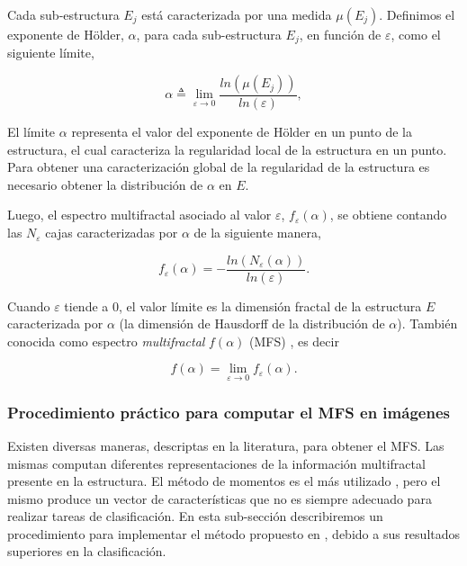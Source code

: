 Cada sub-estructura $E_{j}$ está caracterizada por una medida $\mu(E_{j})$.
Definimos el exponente de H\"older, $\alpha$, para cada sub-estructura $E_{j}$, en función de $\varepsilon$, como el siguiente límite,


\begin{equation}
\alpha \triangleq \lim_{\varepsilon \rightarrow 0}{\frac{ln(\mu(E_{j}))}{ln(\varepsilon)} },
\label{eq:holder}
\end{equation}
\noindent

El límite $\alpha$ representa el valor del exponente de H\"older en un punto de la estructura, el cual caracteriza la regularidad local de la estructura en un punto.
Para obtener una caracterización global de la regularidad de la estructura es necesario obtener la distribución de $\alpha$ en $E$.

Luego, el espectro multifractal asociado al valor $\varepsilon$, $f_{\varepsilon}(\alpha)$, se obtiene contando las $N_{\varepsilon}$ cajas caracterizadas por $\alpha$ de la siguiente manera,

\begin{equation}
f_{\varepsilon}(\alpha) = - \frac{ln(N_{\varepsilon}(\alpha))}{ln(\varepsilon)}.
\label{eq:eqn6}
\end{equation}

Cuando $\varepsilon$ tiende a $0$, el valor límite es la dimensión fractal de la estructura $E$ caracterizada por $\alpha$ (la dimensión de Hausdorff de la distribución de $\alpha$).
También conocida como espectro {\em multifractal} $f(\alpha)$ (MFS) \cite{Silvetti2010}, es decir

\begin{equation}
f(\alpha) = \lim_{\varepsilon\to0}{f_{\varepsilon}(\alpha)}.
\label{eq:mfs}
\end{equation}

\subsubsection{Procedimiento práctico para computar el MFS en imágenes}
Existen diversas maneras, descriptas en la literatura, para obtener el MFS.
Las mismas computan diferentes representaciones de la información multifractal presente en la estructura.
El método de momentos es el más utilizado \cite{Mendoza2010,Serrano2012}, pero el mismo produce un vector de características que no es siempre adecuado para realizar tareas de clasificación.
En esta sub-sección describiremos un procedimiento para implementar el método propuesto en \cite{Xu2009}, debido a sus resultados superiores en la clasificación.

